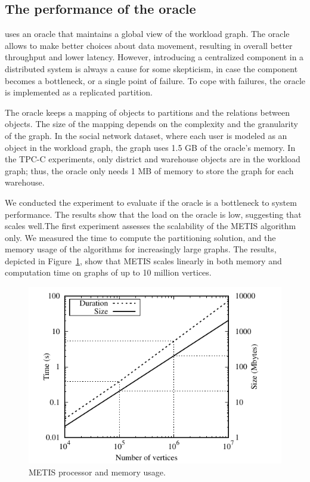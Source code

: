 \subsection{The performance of the oracle}

\dynastar  uses an oracle that maintains a global view of the workload graph.
The oracle allows \dynastar to make better choices about data movement,
resulting in overall better throughput and lower latency. However, introducing a
centralized component in a distributed system is always a cause for some
skepticism, in case the component becomes a bottleneck, or a single point of
failure. To cope with failures, the oracle is implemented as a replicated
partition.

The oracle keeps a mapping of objects to partitions and the relations between
objects. The size of the mapping depends on the complexity and the granularity
of the graph. In the social network dataset, where each user is modeled as an
object in the workload graph, the graph uses 1.5 GB of the oracle's memory. In
the TPC-C experiments, only district and warehouse objects are in the workload
graph; thus, the oracle only needs 1 MB of memory to store the graph for each
warehouse.

We conducted the experiment to evaluate if the \dynastar oracle is a bottleneck
to system performance. The results show that the load on the oracle is low,
suggesting that \dynastar scales well.The first experiment assesses the
scalability of the METIS algorithm only. We measured the time to compute the
partitioning solution, and the memory usage of the algorithms for increasingly
large graphs. The results, depicted in Figure~\ref{fig:metis_size_time}, show
that METIS scales linearly in both memory and computation time on graphs of up
to 10 million vertices.

\begin{figure}[ht!]
  \centering
    \includegraphics[width=0.7\columnwidth]{./figures/experiments/dynastar/metis_size_time}
	\caption{METIS processor and memory usage.}
	\label{fig:metis_size_time}
\end{figure}

